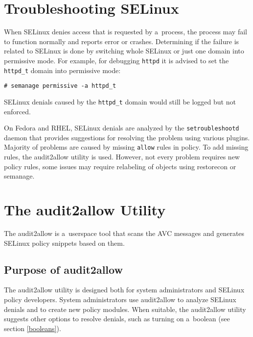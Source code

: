 \section{Troubleshooting SELinux}

When SELinux denies access that is requested by a~process, the process may fail
to function normally and reports error or crashes. Determining if the failure is
related to SELinux is done by switching whole SELinux or just one domain into
permissive mode. For example, for debugging \texttt{httpd} it is advised to set
the \texttt{httpd\_t} domain into permissive mode:
\begin{lstlisting}
# semanage permissive -a httpd_t
\end{lstlisting}
SELinux denials caused by the \texttt{httpd\_t} domain would still be logged but
not enforced.

On Fedora and RHEL, SELinux denials are analyzed by the \texttt{setroubleshootd}
daemon that provides suggestions for resolving the problem using various
plugins. Majority of problems are caused by missing \texttt{allow} rules in
policy. To add missing rules, the audit2allow utility is used. However, not
every problem requires new policy rules, some issues may require relabeling of
objects using restorecon or semanage.

\section{The audit2allow Utility}
\label{audit2allow}
The audit2allow is a~userspace tool that scans the AVC messages and generates
SELinux policy snippets based on them.

\subsection{Purpose of audit2allow}
The audit2allow utility is designed both for system administrators and SELinux
policy developers. System administrators use audit2allow to analyze SELinux
denials and to create new policy modules. When suitable, the audit2allow utility
suggests other options to resolve denials, such as turning on a~boolean (see
section \ref{booleans}).

